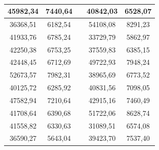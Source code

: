 \documentclass[11pt]{article}
\begin{document}
\begin{table}[H]
\begin{tabular}{|c|c|c|c|c|}
45982,34                                        & 7440,64                                                  &  & 40842,03                                          & 6528,07                                                    \\ \hline
36368,51                                        & 6182,54                                                  &  & 54108,08                                          & 8291,23                                                    \\ \hline
41933,76                                        & 6785,24                                                  &  & 33729,79                                          & 5862,97                                                    \\ \hline
42250,38                                        & 6753,25                                                  &  & 37559,83                                          & 6385,15                                                    \\ \hline
42448,45                                        & 6712,69                                                  &  & 49722,93                                          & 7948,24                                                    \\ \hline
52673,57                                        & 7982,31                                                  &  & 38965,69                                          & 6773,52                                                    \\ \hline
40125,72                                        & 6285,92                                                  &  & 40831,56                                          & 7098,05                                                    \\ \hline
47582,94                                        & 7210,64                                                  &  & 42915,16                                          & 7460,49                                                    \\ \hline
41708,64                                        & 6390,68                                                  &  & 51722,06                                          & 8628,74                                                    \\ \hline
41558,82                                        & 6330,63                                                  &  & 31089,51                                          & 6574,08                                                    \\ \hline
36590,27                                        & 5643,04                                                  &  & 39423,70                                          & 7537,40                                                    \\ \hline
\end{tabular}
\caption{}
\end{table}
\end{document}
